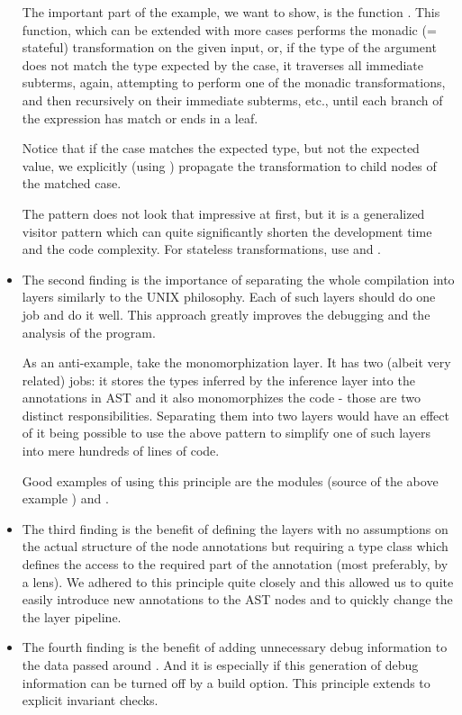 \begin{itemize}
\begin{ex}
        The important part of the example, we want to show, is the function \linebreak {}. This function, which can be extended with more  cases performs the monadic (= stateful) transformation  on the given input, or, if the type of the argument does not match the type expected by the case, it traverses all immediate subterms, again, attempting to perform one of the monadic transformations, and then recursively on their immediate subterms, etc., until each branch of the expression has match or ends in a leaf.

        Notice that if the case matches the expected type, but not the expected value, we explicitly (using ) propagate the transformation to child nodes of the matched case.
    \end{ex}

    The  pattern does not look that impressive at first, but it is a generalized visitor pattern which can quite significantly shorten the development time and the code complexity. For stateless transformations, use  and .

    \item The second finding is the importance of separating the whole compilation into layers similarly to the UNIX philosophy. Each of such layers should do one job and do it well. This approach greatly improves the debugging and the analysis of the program.

    As an anti-example, take the monomorphization layer. It has two (albeit very related) jobs: it stores the types inferred by the inference layer into the annotations in AST and it also monomorphizes the code - those are two distinct responsibilities. Separating them into two layers would have an effect of it being possible to use the above pattern to simplify one of such layers into mere hundreds of lines of code.

    Good examples of using this principle are the modules  (source of the above example ) and .

    \item The third finding is the benefit of defining the layers with no assumptions on the actual structure of the node annotations but requiring a type class which defines the access to the required part of the annotation (most preferably, by a lens). We adhered to this principle quite closely and this allowed us to quite easily introduce new annotations to the AST nodes and to quickly change the the layer pipeline.

    \item The fourth finding is the benefit of adding unnecessary debug information to the data passed around . And it is especially if this generation of debug information can be turned off by a build option. This principle extends to explicit invariant checks.

\end{itemize}

